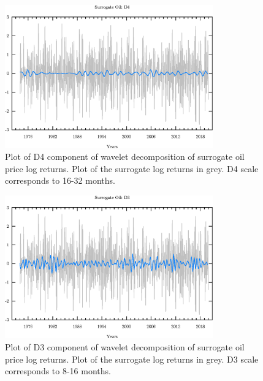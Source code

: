 \begin{figure}
\begin{center}
\includegraphics[width=0.8\textwidth]{./code/plot/surrogate_oil_wr_D4.eps}
\caption{Plot of D4 component of wavelet decomposition of surrogate oil price log returns. 
	Plot of the surrogate log returns in grey. D4 scale corresponds to 16-32 months.}
\end{center}
\label{fig:s-oil-wr-d4}
\end{figure}

\begin{figure}
\begin{center}
\includegraphics[width=0.8\textwidth]{./code/plot/surrogate_oil_wr_D3.eps}
\caption{Plot of D3 component of wavelet decomposition of surrogate oil price log returns. 
	Plot of the surrogate log returns in grey. D3 scale corresponds to 8-16 months.}
\end{center}
\label{fig:s-oil-wr-d3}
\end{figure}

